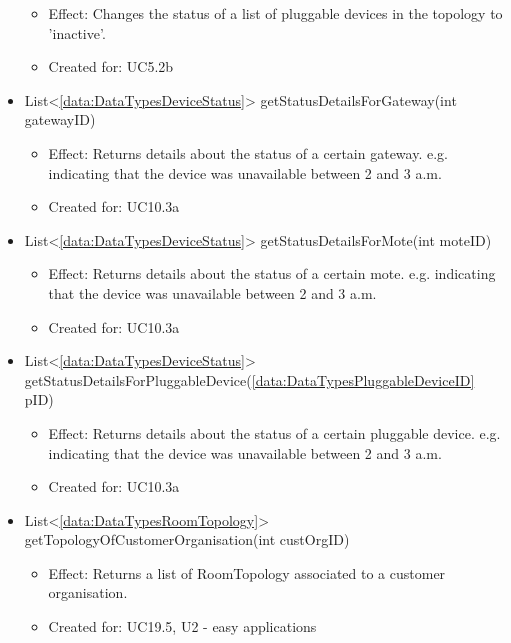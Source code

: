 \begin{description}
\begin{itemize}[noitemsep,nolistsep,leftmargin=-.25cm]
        \begin{itemize}[noitemsep,nolistsep]
           \item Effect: Changes the status of a list of pluggable devices in the topology to 'inactive'.
\item Created for: UC5.2b
        \end{itemize}
      \item \textsf{List\textless{}\ref{data:DataTypesDeviceStatus}\textgreater{} getStatusDetailsForGateway(int gatewayID)}
        \begin{itemize}[noitemsep,nolistsep]
           \item Effect: Returns details about the status of a certain gateway. e.g. indicating that the device was unavailable between 2 and 3 a.m.
\item Created for: UC10.3a
        \end{itemize}
      \item \textsf{List\textless{}\ref{data:DataTypesDeviceStatus}\textgreater{} getStatusDetailsForMote(int moteID)}
        \begin{itemize}[noitemsep,nolistsep]
           \item Effect: Returns details about the status of a certain mote. e.g. indicating that the device was unavailable between 2 and 3 a.m.
\item Created for: UC10.3a
        \end{itemize}
      \item \textsf{List\textless{}\ref{data:DataTypesDeviceStatus}\textgreater{} getStatusDetailsForPluggableDevice(\ref{data:DataTypesPluggableDeviceID} pID)}
        \begin{itemize}[noitemsep,nolistsep]
           \item Effect: Returns details about the status of a certain pluggable device. e.g. indicating that the device was unavailable between 2 and 3 a.m.
\item Created for: UC10.3a
        \end{itemize}
      \item \textsf{List\textless{}\ref{data:DataTypesRoomTopology}\textgreater{} getTopologyOfCustomerOrganisation(int custOrgID)}
        \begin{itemize}[noitemsep,nolistsep]
           \item Effect: Returns a list of RoomTopology associated to a customer organisation.
\item Created for: UC19.5, U2 - easy applications
        \end{itemize}

\end{itemize}
\end{description}
